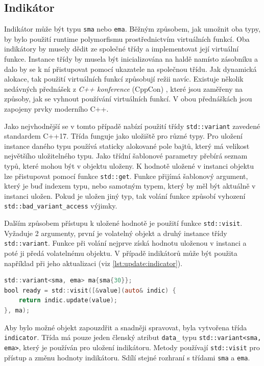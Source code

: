 \subsection{Indikátor}
Indikátor může být typu \texttt{sma} nebo \texttt{ema}.
Běžným způsobem, jak umožnit oba typy, by bylo použití runtime polymorfismu prostřednictvím virtuálních funkcí.
Oba indikátory by musely dědit ze společné třídy a implementovat její virtuální funkce.
Instance třídy by musela být inicializována na haldě namísto zásobníku a dalo by se k ní přistupovat pomocí ukazatele na společnou třídu.
Jak dynamická alokace, tak použití virtuálních funkcí způsobují režii navíc.
Existuje několik nedávných přednášek z \textit{C++ konference} (CppCon) \cite{gobel-virtual, bogosavljevic-virtual}, které jsou zaměřeny na způsoby, jak se vyhnout používání virtuálních funkcí.
V obou přednáškách jsou zapojeny prvky moderního C++.

Jako nejvhodnější se v tomto případě nabízí použití třídy \texttt{std::variant} zavedené standardem C++17.
Třída funguje jako uložiště pro různé typy.
Pro uložení instance daného typu používá staticky alokované pole bajtů, který má velikost největšího uložitelného typu.
Jako třídní šablonové parametry přebírá seznam typů, které mohou být v objektu uloženy.
K hodnotě uložené v instanci objektu lze přistupovat pomocí funkce \texttt{std::get}.
Funkce přijímá šablonový argument, který je buď indexem typu, nebo samotným typem, který by měl být aktuálně v instanci uložen.
Pokud je uložen jiný typ, tak volání funkce způsobí vyhození \texttt{std::bad\_variant\_access} výjimky.

Dalším způsobem přístupu k uložené hodnotě je použití funkce \texttt{std::visit}.
Vyžaduje 2 argumenty, první je volatelný objekt a druhý instance třídy \texttt{std::variant}.
Funkce při volání nejprve získá hodnotu uloženou v instanci a poté ji předá volatelnému objektu.
V případě indikátorů může být použita například při jeho aktualizaci (viz \ref{lst:update:indicator}).

\begin{lstlisting}[caption={~Aktualizace indikátoru pomocí std::visit},label={lst:update:indicator},captionpos=t,abovecaptionskip=-\medskipamount,belowcaptionskip=\medskipamount,language=C]
std::variant<sma, ema> ma{sma{30}};
bool ready = std::visit([&value](auto& indic) {
    return indic.update(value);
}, ma);
\end{lstlisting}

Aby bylo možné objekt zapouzdřit a snadněji spravovat, byla vytvořena třída \texttt{indicator}.
Třída má pouze jeden členský atribut \texttt{data\_} typu \texttt{std::variant<sma, ema>}, který je používán pro uložení indikátoru.
Metody používají \texttt{std::visit} pro přístup a změnu hodnoty indikátoru.
Sdílí stejné rozhraní s třídami \texttt{sma} a \texttt{ema}.

